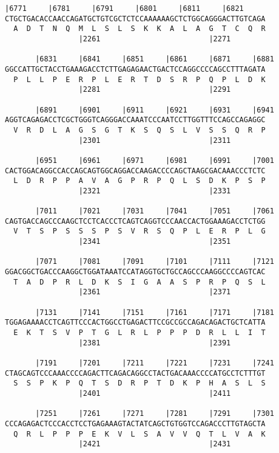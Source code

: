 \documentclass{article}
\begin{document}
\begin{Verbatim}[fontfamily=courier]
       |6771     |6781     |6791     |6801     |6811     |6821
CTGCTGACACCAACCAGATGCTGTCGCTCTCCAAAAAAGCTCTGGCAGGGACTTGTCAGA
  A  D  T  N  Q  M  L  S  L  S  K  K  A  L  A  G  T  C  Q  R
                 |2261                         |2271        

       |6831     |6841     |6851     |6861     |6871     |6881
GGCCATTGCTACCTGAAAGACCTCTTGAGAGAACTGACTCCAGGCCCCAGCCTTTAGATA
  P  L  L  P  E  R  P  L  E  R  T  D  S  R  P  Q  P  L  D  K
                 |2281                         |2291        

       |6891     |6901     |6911     |6921     |6931     |6941
AGGTCAGAGACCTCGCTGGGTCAGGGACCAAATCCCAATCCTTGGTTTCCAGCCAGAGGC
  V  R  D  L  A  G  S  G  T  K  S  Q  S  L  V  S  S  Q  R  P
                 |2301                         |2311        

       |6951     |6961     |6971     |6981     |6991     |7001
CACTGGACAGGCCACCAGCAGTGGCAGGACCAAGACCCCAGCTAAGCGACAAACCCTCTC
  L  D  R  P  P  A  V  A  G  P  R  P  Q  L  S  D  K  P  S  P
                 |2321                         |2331        

       |7011     |7021     |7031     |7041     |7051     |7061
CAGTGACCAGCCCAAGCTCCTCACCCTCAGTCAGGTCCCAACCACTGGAAAGACCTCTGG
  V  T  S  P  S  S  S  P  S  V  R  S  Q  P  L  E  R  P  L  G
                 |2341                         |2351        

       |7071     |7081     |7091     |7101     |7111     |7121
GGACGGCTGACCCAAGGCTGGATAAATCCATAGGTGCTGCCAGCCCAAGGCCCCAGTCAC
  T  A  D  P  R  L  D  K  S  I  G  A  A  S  P  R  P  Q  S  L
                 |2361                         |2371        

       |7131     |7141     |7151     |7161     |7171     |7181
TGGAGAAAACCTCAGTTCCCACTGGCCTGAGACTTCCGCCGCCAGACAGACTGCTCATTA
  E  K  T  S  V  P  T  G  L  R  L  P  P  P  D  R  L  L  I  T
                 |2381                         |2391        

       |7191     |7201     |7211     |7221     |7231     |7241
CTAGCAGTCCCAAACCCCAGACTTCAGACAGGCCTACTGACAAACCCCATGCCTCTTTGT
  S  S  P  K  P  Q  T  S  D  R  P  T  D  K  P  H  A  S  L  S
                 |2401                         |2411        

       |7251     |7261     |7271     |7281     |7291     |7301
CCCAGAGACTCCCACCTCCTGAGAAAGTACTATCAGCTGTGGTCCAGACCCTTGTAGCTA
  Q  R  L  P  P  P  E  K  V  L  S  A  V  V  Q  T  L  V  A  K
                 |2421                         |2431        

\end{Verbatim}
\end{document}
